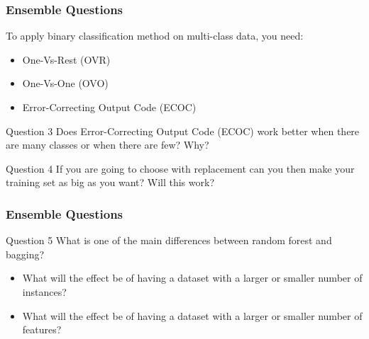 \documentclass[aspectratio=169, 10pt]{beamer}
\begin{document}
\begin{frame}
    \frametitle{Ensemble Questions}

    To apply binary classification method on multi-class data, you need:

    \begin{itemize}
        \item One-Vs-Rest (OVR)
        \item One-Vs-One (OVO)
        \item Error-Correcting Output Code (ECOC)
    \end{itemize}

    \begin{block}{Question 3}
        Does Error-Correcting Output Code (ECOC) work better when there are many classes or when there are few? Why? 
    \end{block}


    \begin{block}{Question 4}
        If you are going to choose with replacement can you then make your training set as big as you want? Will this work? 
    \end{block}


\end{frame}

\begin{frame}
    \frametitle{Ensemble Questions}
    \begin{block}{Question 5}
        What is one of the main differences between random forest and bagging?
        \begin{itemize}
            \item What will the effect be of having a dataset with a larger or smaller number of instances?\\
            \item What will the effect be of having a dataset with a larger or smaller number of features?\\
        \end{itemize}
    \end{block}

\end{frame}
\end{document}
